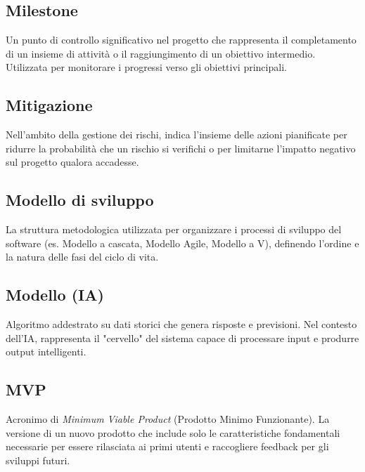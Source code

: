 \documentclass[a4paper, 11pt, oneside]{scrartcl} %
\begin{document}
\subsection*{Milestone}
Un punto di controllo significativo nel progetto che rappresenta il completamento di un insieme di attività o il raggiungimento di un obiettivo intermedio. Utilizzata per monitorare i progressi verso gli obiettivi principali.
\vspace{0.5cm}

\subsection*{Mitigazione}
Nell'ambito della gestione dei rischi, indica l'insieme delle azioni pianificate per ridurre la probabilità che un rischio si verifichi o per limitarne l'impatto negativo sul progetto qualora accadesse.
\vspace{0.5cm}

\subsection*{Modello di sviluppo}
La struttura metodologica utilizzata per organizzare i processi di sviluppo del software (es. Modello a cascata, Modello Agile, Modello a V), definendo l'ordine e la natura delle fasi del ciclo di vita.
\vspace{0.5cm}

\subsection*{Modello (IA)}


Algoritmo addestrato su dati storici che genera risposte e previsioni. Nel contesto dell'IA, rappresenta il "cervello" del sistema capace di processare input e produrre output intelligenti.

\vspace{0.5cm}

\subsection*{MVP}
Acronimo di \textit{Minimum Viable Product} (Prodotto Minimo Funzionante). La versione di un nuovo prodotto che include solo le caratteristiche fondamentali necessarie per essere rilasciata ai primi utenti e raccogliere feedback per gli sviluppi futuri.
\vspace{0.5cm}
\end{document}
